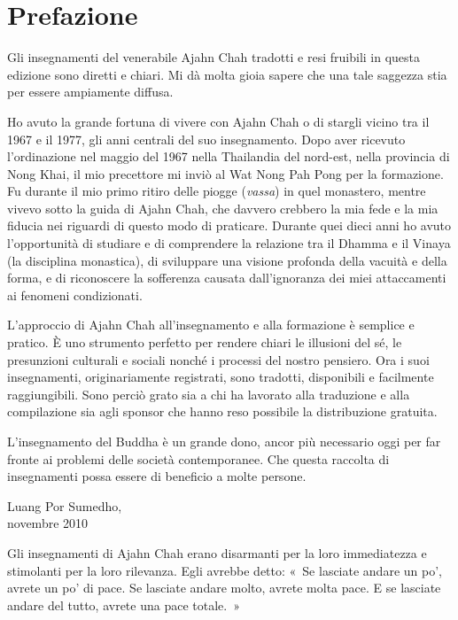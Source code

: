 \chapter{Prefazione}

Gli insegnamenti del venerabile Ajahn Chah tradotti e resi fruibili in
questa edizione sono diretti e chiari. Mi dà molta gioia sapere che una
tale saggezza stia per essere ampiamente diffusa.

Ho avuto la grande fortuna di vivere con Ajahn Chah o di stargli vicino
tra il 1967 e il 1977, gli anni centrali del suo insegnamento. Dopo aver
ricevuto l'ordinazione nel maggio del 1967 nella Thailandia del
nord-est, nella provincia di Nong Khai, il mio precettore mi inviò al
Wat Nong Pah Pong per la formazione. Fu durante il mio primo ritiro
delle piogge (\emph{vassa}) in quel monastero, mentre vivevo sotto la
guida di Ajahn Chah, che davvero crebbero la mia fede e la mia fiducia
nei riguardi di questo modo di praticare. Durante quei dieci anni ho
avuto l'opportunità di studiare e di comprendere la relazione tra il
Dhamma e il Vinaya (la disciplina monastica), di sviluppare una visione
profonda della vacuità e della forma, e di riconoscere la sofferenza
causata dall'ignoranza dei miei attaccamenti ai fenomeni condizionati.

L'approccio di Ajahn Chah all'insegnamento e alla formazione è semplice
e pratico. È uno strumento perfetto per rendere chiari le illusioni del
sé, le presunzioni culturali e sociali nonché i processi del nostro
pensiero. Ora i suoi insegnamenti, originariamente registrati, sono
tradotti, disponibili e facilmente raggiungibili. Sono perciò grato sia
a chi ha lavorato alla traduzione e alla compilazione sia agli sponsor
che hanno reso possibile la distribuzione gratuita.

L'insegnamento del Buddha è un grande dono, ancor più necessario oggi
per far fronte ai problemi delle società contemporanee. Che questa
raccolta di insegnamenti possa essere di beneficio a molte persone.

\bigskip

{\raggedleft
  Luang Por Sumedho,\\
  novembre 2010
\par}

\clearpage

Gli insegnamenti di Ajahn Chah erano disarmanti per la loro immediatezza
e stimolanti per la loro rilevanza. Egli avrebbe detto: «~Se lasciate
andare un po', avrete un po' di pace. Se lasciate andare molto, avrete
molta pace. E se lasciate andare del tutto, avrete una pace totale.~»

